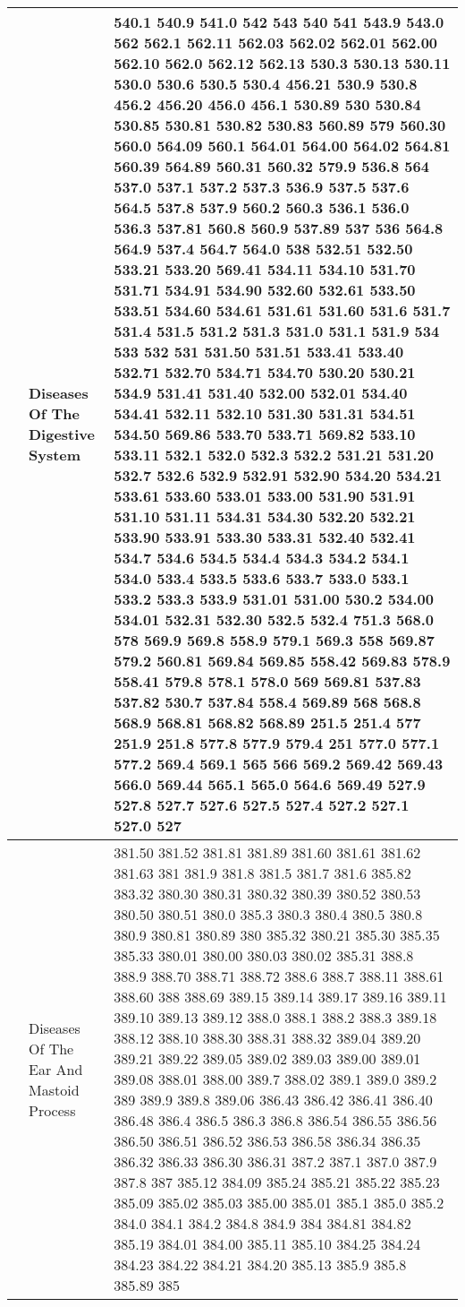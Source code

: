 \begin{longtable}{|R{.05in}|L{.5in}||L{5.75in}|}
    & Diseases Of The Digestive System &  540.1 540.9 541.0 542 543 540 541 543.9 543.0 562 562.1 562.11 562.03 562.02 562.01 562.00 562.10 562.0 562.12 562.13 530.3 530.13 530.11 530.0 530.6 530.5 530.4 456.21 530.9 530.8 456.2 456.20 456.0 456.1 530.89 530 530.84 530.85 530.81 530.82 530.83 560.89 579 560.30 560.0 564.09 560.1 564.01 564.00 564.02 564.81 560.39 564.89 560.31 560.32 579.9 536.8 564 537.0 537.1 537.2 537.3 536.9 537.5 537.6 564.5 537.8 537.9 560.2 560.3 536.1 536.0 536.3 537.81 560.8 560.9 537.89 537 536 564.8 564.9 537.4 564.7 564.0 538 532.51 532.50 533.21 533.20 569.41 534.11 534.10 531.70 531.71 534.91 534.90 532.60 532.61 533.50 533.51 534.60 534.61 531.61 531.60 531.6 531.7 531.4 531.5 531.2 531.3 531.0 531.1 531.9 534 533 532 531 531.50 531.51 533.41 533.40 532.71 532.70 534.71 534.70 530.20 530.21 534.9 531.41 531.40 532.00 532.01 534.40 534.41 532.11 532.10 531.30 531.31 534.51 534.50 569.86 533.70 533.71 569.82 533.10 533.11 532.1 532.0 532.3 532.2 531.21 531.20 532.7 532.6 532.9 532.91 532.90 534.20 534.21 533.61 533.60 533.01 533.00 531.90 531.91 531.10 531.11 534.31 534.30 532.20 532.21 533.90 533.91 533.30 533.31 532.40 532.41 534.7 534.6 534.5 534.4 534.3 534.2 534.1 534.0 533.4 533.5 533.6 533.7 533.0 533.1 533.2 533.3 533.9 531.01 531.00 530.2 534.00 534.01 532.31 532.30 532.5 532.4 751.3 568.0 578 569.9 569.8 558.9 579.1 569.3 558 569.87 579.2 560.81 569.84 569.85 558.42 569.83 578.9 558.41 579.8 578.1 578.0 569 569.81 537.83 537.82 530.7 537.84 558.4 569.89 568 568.8 568.9 568.81 568.82 568.89 251.5 251.4 577 251.9 251.8 577.8 577.9 579.4 251 577.0 577.1 577.2 569.4 569.1 565 566 569.2 569.42 569.43 566.0 569.44 565.1 565.0 564.6 569.49 527.9 527.8 527.7 527.6 527.5 527.4 527.2 527.1 527.0 527\\\hline
    & Diseases Of The Ear And Mastoid Process
  &  381.50 381.52 381.81 381.89 381.60 381.61 381.62 381.63 381 381.9 381.8 381.5 381.7 381.6 385.82 383.32 380.30 380.31 380.32 380.39 380.52 380.53 380.50 380.51 380.0 385.3 380.3 380.4 380.5 380.8 380.9 380.81 380.89 380 385.32 380.21 385.30 385.35 385.33 380.01 380.00 380.03 380.02 385.31 388.8 388.9 388.70 388.71 388.72 388.6 388.7 388.11 388.61 388.60 388 388.69 389.15 389.14 389.17 389.16 389.11 389.10 389.13 389.12 388.0 388.1 388.2 388.3 389.18 388.12 388.10 388.30 388.31 388.32 389.04 389.20 389.21 389.22 389.05 389.02 389.03 389.00 389.01 389.08 388.01 388.00 389.7 388.02 389.1 389.0 389.2 389 389.9 389.8 389.06 386.43 386.42 386.41 386.40 386.48 386.4 386.5 386.3 386.8 386.54 386.55 386.56 386.50 386.51 386.52 386.53 386.58 386.34 386.35 386.32 386.33 386.30 386.31 387.2 387.1 387.0 387.9 387.8 387 385.12 384.09 385.24 385.21 385.22 385.23 385.09 385.02 385.03 385.00 385.01 385.1 385.0 385.2 384.0 384.1 384.2 384.8 384.9 384 384.81 384.82 385.19 384.01 384.00 385.11 385.10 384.25 384.24 384.23 384.22 384.21 384.20 385.13 385.9 385.8 385.89 385

\end{longtable}
